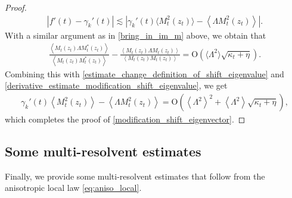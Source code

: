 \documentclass[10pt,reqno]{amsart}
\numberwithin{equation}{section}
\numberwithin{figure}{section}
\theoremstyle{plain} %
\theoremstyle{definition} %
\newcommand{\p}[1]{({#1})}
\newcommand{\pa}[1]{\left({#1}\right)}
\newcommand{\absa}[1]{\left\lvert #1 \right\rvert}
\newcommand{\avg}[1]{\langle #1 \rangle}
\newcommand{\avga}[1]{\left\langle #1 \right\rangle}
\newcommand{\OO}{\mathrm{O}}
\numberwithin{equation}{section}
\begin{document}
\begin{proof}
    \begin{equation}\nonumber
        \begin{aligned}
            \absa{f'\p{t}-\gamma_k'\p{t}}\lesssim \absa{\gamma_k'\p{t}\avg{M_t^2\p{z_t}}-\avga{\Lambda M_t^2\p{z_t}}}.
        \end{aligned}
    \end{equation}
With a similar argument as in \eqref{bring_in_im_m} above, we obtain that 
    \begin{equation}\nonumber
        \begin{aligned}
            \frac{\avga{M_t\p{z_t}\Lambda M_t^{*}\p{z_t}}}{\avga{M_t\p{z_t}M_t^{*}\p{z_t}}}-\frac{\avga{M_t\p{z_t}\Lambda M_t\p{z_t}}}{\avga{M_t\p{z_t}M_t\p{z_t}}}=\OO\pa{\avg{\Lambda^2}\sqrt{\kappa_t+\eta}}.
        \end{aligned}
    \end{equation}
    Combining this with \eqref{estimate_change_definition_of_shift_eigenvalue} and \eqref{derivative_estimate_modification_shift_eigenvalue}, we get
    \begin{equation}\nonumber
        \begin{aligned}
            \gamma_k'\p{t}\avga{M_t^2\p{z_t}}-\avga{\Lambda M_t^2\p{z_t}}=\OO\pa{\avga{\Lambda^2}^2+\avga{\Lambda^2}\sqrt{\kappa_t+\eta}},
        \end{aligned}
    \end{equation}
    which completes the proof of \eqref{modification_shift_eigenvector}.
\end{proof}

\subsection{Some multi-resolvent estimates}
Finally, we provide some multi-resolvent estimates that follow from the anisotropic local law \eqref{eq:aniso_local}.
\end{document}
